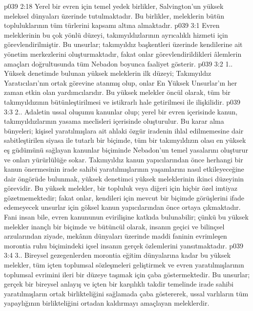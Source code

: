 \vs p039 2:18 Yerel bir evren için temel yedek birlikler, Salvington’un yüksek meleksel dünyaları üzerinde tutulmaktadır. Bu birlikler, meleklerin bütün topluluklarının tüm türlerini kapsamı altına almaktadır.
\vs p039 3:1 Evren meleklerinin bu çok yönlü düzeyi, takımyıldızlarının ayrıcalıklı hizmeti için görevlendirilmiştir. Bu unsurlar; takımyıldız başkentleri üzerinde kendilerine ait yönetim merkezlerini oluşturmaktadır, fakat onlar görevlendirildikleri âlemlerin amaçları doğrultusunda tüm Nebadon boyunca faaliyet gösterir.
\vs p039 3:2 1.\bibnobreakspace {}. Yüksek denetimde bulunan yüksek meleklerin ilk düzeyi; Takımyıldız Yaratıcıları’nın ortak görevine atanmış olup, onlar En Yüksek Unsurlar’ın her zaman etkin olan yardımcılarıdır. Bu yüksek melekler öncül olarak, tüm bir takımyıldızının bütünleştirilmesi ve istikrarlı hale getirilmesi ile ilişkilidir.
\vs p039 3:3 2.\bibnobreakspace {}. Adaletin ussal oluşumu kanunlar olup; yerel bir evren içerisinde kanun, takımyıldızlarının yasama meclisleri içerisinde oluşturulur. Bu karar alma bünyeleri; kişisel yaratılmışlara ait ahlaki özgür iradenin ihlal edilmemesine dair sabitleştirilen siyasa ile tutarlı bir biçimde, tüm bir takımyıldızın olası en yüksek eş güdümünü sağlayan kanunlar biçiminde Nebadon’un temel yasalarını oluşturur ve onları yürürlülüğe sokar. Takımyıldız kanun yapıcılarından önce herhangi bir kanun önermesinin irade sahibi yaratılmışlarının yaşamlarını nasıl etkileyeceğine dair öngörüde bulunmak, yüksek denetimci yüksek meleklerinin ikinci düzeyinin görevidir. Bu yüksek melekler, bir topluluk veya diğeri için hiçbir özel imtiyaz gözetmemektedir; fakat onlar, kendileri için mevcut bir biçimde görüşlerini ifade edemeyecek unsurlar için göksel kanun yapıcılarından önce ortaya çıkmaktadır. Fani insan bile, evren kanununun evirilişine katkıda bulunabilir; çünkü bu yüksek melekler inançlı bir biçimde ve bütüncül olarak, insanın geçici ve bilinçsel arzularından ziyade, mekânın dünyaları üzerinde maddi faninin evrimleşen morontia ruhu biçimindeki içsel insanın gerçek özlemlerini yansıtmaktadır.
\vs p039 3:4 3.\bibnobreakspace {}. Bireysel gezegenlerden morontia eğitim dünyalarına kadar bu yüksek melekler, tüm içten toplumsal sözleşmeleri geliştirmek ve evren yaratılmışlarının toplumsal evrimini ileri bir düzeye taşımak için çaba göstermektedir. Bu unsurlar; gerçek bir bireysel anlayış ve içten bir karşılıklı takdir temelinde irade sahibi yaratılmışların ortak birlikteliğini sağlamada çaba göstererek, ussal varlıların tüm yapaylığının birlikteliğini ortadan kaldırmayı amaçlayan meleklerdir.
